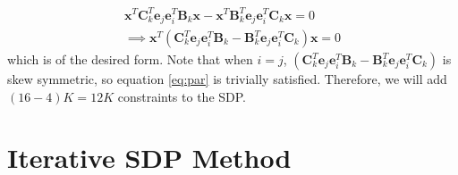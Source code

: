 \documentclass{article}
\newcommand{\mbf}[1]{\mathbf{#1}}
\begin{document}
\begin{align}
    \mbf{x}^T \mbf{C}_k^T \mbf{e}_j \mbf{e}_i^T  \mbf{B}_k \mbf{x} - \mbf{x}^T \mbf{B}_k^T \mbf{e}_j \mbf{e}_i^T  \mbf{C}_k \mbf{x} = 0 \\
    \implies
    \mbf{x}^T (\mbf{C}_k^T \mbf{e}_j \mbf{e}_i^T  \mbf{B}_k - \mbf{B}_k^T \mbf{e}_j \mbf{e}_i^T \mbf{C}_k) \mbf{x} = 0 \label{eq:par}
\end{align}
which is of the desired form. Note that when $i = j$, $(\mbf{C}_k^T \mbf{e}_j \mbf{e}_i^T  \mbf{B}_k - \mbf{B}_k^T \mbf{e}_j \mbf{e}_i^T \mbf{C}_k)$
is skew symmetric, so equation \ref{eq:par} is trivially satisfied. Therefore, we will add $(16 - 4)K = 12K$ constraints to the SDP.

\section{Iterative SDP Method}
\end{document}
